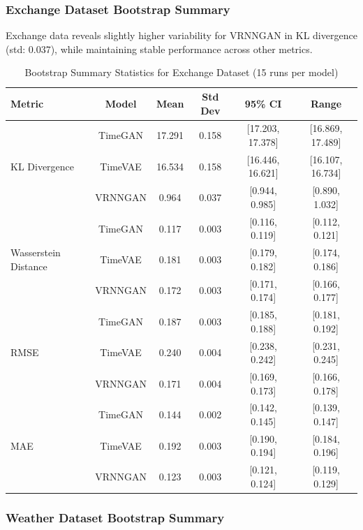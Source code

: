 \documentclass{article}
\begin{document}
\subsubsection{Exchange Dataset Bootstrap Summary}

Exchange data reveals slightly higher variability for VRNNGAN in KL divergence (std: 0.037), while maintaining stable performance across other metrics.
\begin{table}[H]
    \centering
\caption{Bootstrap Summary Statistics for Exchange Dataset (15 runs per model)}
\label{tab:bootstrap_exchange}
\small
\begin{tabular}{lccccc}
\toprule
\textbf{Metric} & \textbf{Model} & \textbf{Mean} & \textbf{Std Dev} & \textbf{95\% CI} & \textbf{Range} \\
\midrule
\multirow{3}{*}{KL Divergence} 
    & TimeGAN   & 17.291 & 0.158 & [17.203, 17.378] & [16.869, 17.489] \\
    & TimeVAE   & 16.534 & 0.158 & [16.446, 16.621] & [16.107, 16.734] \\
    & VRNNGAN   & 0.964  & 0.037 & [0.944, 0.985]   & [0.890, 1.032] \\
\midrule
\multirow{3}{*}{Wasserstein Distance} 
    & TimeGAN   & 0.117 & 0.003 & [0.116, 0.119] & [0.112, 0.121] \\
    & TimeVAE   & 0.181 & 0.003 & [0.179, 0.182] & [0.174, 0.186] \\
    & VRNNGAN   & 0.172 & 0.003 & [0.171, 0.174] & [0.166, 0.177] \\
\midrule
\multirow{3}{*}{RMSE} 
    & TimeGAN   & 0.187 & 0.003 & [0.185, 0.188] & [0.181, 0.192] \\
    & TimeVAE   & 0.240 & 0.004 & [0.238, 0.242] & [0.231, 0.245] \\
    & VRNNGAN   & 0.171 & 0.004 & [0.169, 0.173] & [0.166, 0.178] \\
\midrule
\multirow{3}{*}{MAE} 
    & TimeGAN   & 0.144 & 0.002 & [0.142, 0.145] & [0.139, 0.147] \\
    & TimeVAE   & 0.192 & 0.003 & [0.190, 0.194] & [0.184, 0.196] \\
    & VRNNGAN   & 0.123 & 0.003 & [0.121, 0.124] & [0.119, 0.129] \\
\bottomrule
\end{tabular}
\end{table}

\subsubsection{Weather Dataset Bootstrap Summary}
\end{document}
